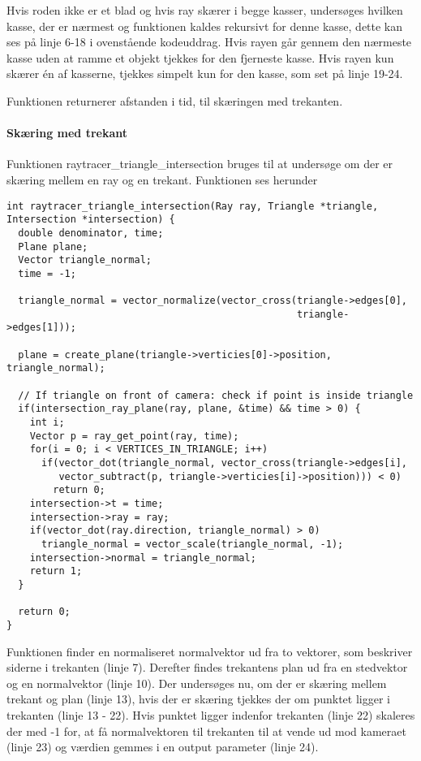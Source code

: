 Hvis roden ikke er et blad og hvis ray skærer i begge kasser, undersøges hvilken kasse, der er nærmest og funktionen kaldes rekursivt for denne kasse, dette kan ses på linje 6-18 i ovenstående kodeuddrag. Hvis rayen går gennem den nærmeste kasse uden at ramme et objekt tjekkes for den fjerneste kasse. Hvis rayen kun skærer én af kasserne, tjekkes simpelt kun for den kasse, som set på linje 19-24.

Funktionen returnerer afstanden i tid, til skæringen med trekanten.

\paragraph{Skæring med trekant}

Funktionen raytracer\_triangle\_intersection bruges til at undersøge om der er skæring mellem en ray og en trekant. Funktionen ses herunder

\begin{lstlisting}[style=Cstyle, caption=Funktionen, der finder skæring med trekant]
int raytracer_triangle_intersection(Ray ray, Triangle *triangle, Intersection *intersection) {
  double denominator, time;
  Plane plane;
  Vector triangle_normal;
  time = -1;

  triangle_normal = vector_normalize(vector_cross(triangle->edges[0], 
                                                  triangle->edges[1]));

  plane = create_plane(triangle->verticies[0]->position, triangle_normal);

  // If triangle on front of camera: check if point is inside triangle
  if(intersection_ray_plane(ray, plane, &time) && time > 0) {
    int i;
    Vector p = ray_get_point(ray, time);
    for(i = 0; i < VERTICES_IN_TRIANGLE; i++)
      if(vector_dot(triangle_normal, vector_cross(triangle->edges[i], 
         vector_subtract(p, triangle->verticies[i]->position))) < 0)
        return 0;
    intersection->t = time;
    intersection->ray = ray;
    if(vector_dot(ray.direction, triangle_normal) > 0)
      triangle_normal = vector_scale(triangle_normal, -1);
    intersection->normal = triangle_normal;
    return 1;
  }

  return 0;
}
\end{lstlisting}

Funktionen finder en normaliseret normalvektor ud fra to vektorer, som beskriver siderne i trekanten (linje 7). Derefter findes trekantens plan ud fra en stedvektor og en normalvektor (linje 10). Der undersøges nu, om der er skæring mellem trekant og plan (linje 13), hvis der er skæring tjekkes der om punktet ligger i trekanten (linje 13 - 22). Hvis punktet ligger indenfor trekanten (linje 22) skaleres der med -1 for, at få normalvektoren til trekanten til at vende ud mod kameraet (linje 23) og værdien gemmes i en output parameter (linje 24).

